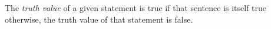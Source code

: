 \guard



\begin{defn}
\label{defn:statementTruthValue}
  The \emph{truth value} of a given statement is true if that sentence is itself true otherwise, the truth value of that statement is false.
\end{defn}
